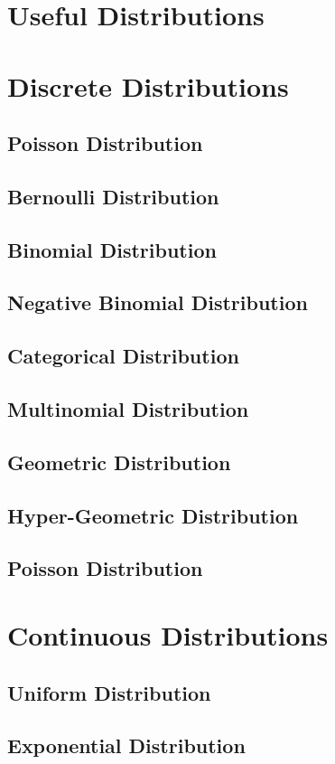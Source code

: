 \section{Useful Distributions}
\section{Discrete Distributions}
\subsection{Poisson Distribution}
\subsection{Bernoulli Distribution}
\subsection{Binomial Distribution}
\subsection{Negative Binomial Distribution}
\subsection{Categorical Distribution}
\subsection{Multinomial Distribution}
\subsection{Geometric Distribution}
\subsection{Hyper-Geometric Distribution}
\subsection{Poisson Distribution}
\section{Continuous Distributions}
\subsection{Uniform Distribution}
\subsection{Exponential Distribution}
